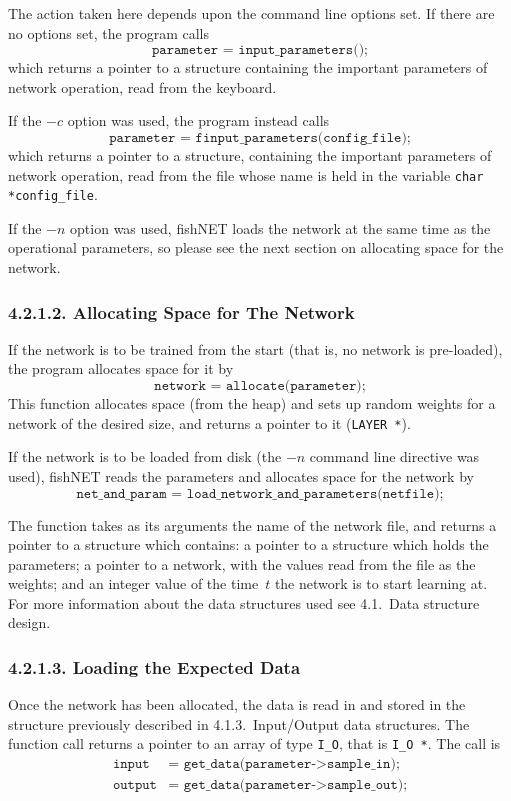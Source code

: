 \documentclass[12pt]{report}
\begin{document}
The action taken here depends upon the command line options set.
If there are no options set, the program calls
$$
	\texttt{parameter = input\_parameters();}
$$
which returns a pointer to a structure containing the important
parameters of network operation, read from the keyboard.

If the $-c$ option was used, the program instead calls
$$
	\texttt{parameter = finput\_parameters(config\_file);}
$$
which returns a pointer to a structure, containing the important
parameters of network operation, read from the file whose name is
held in the variable \texttt{char *config\_file}.

If the $-n$ option was used, fishNET loads the network at the same
time as the operational parameters, so please see the next section
on allocating space for the network.

\subsubsection{4.2.1.2. Allocating Space for The Network}

If the network is to be trained from the start (that is, no network
is pre-loaded), the program allocates space for it by
$$
	\texttt{network = allocate(parameter);}
$$
This function allocates space (from the heap) and sets up random
weights for a network of the desired size, and returns a pointer to
it (\texttt{LAYER *}).

If the network is to be loaded from disk (the $-n$ command line
directive was used), fishNET reads the parameters and allocates
space for the network by
$$
	\texttt{net\_and\_param = load\_network\_and\_parameters(netfile);}
$$

The function takes as its arguments the name of the network file,
and returns a pointer to a structure which contains: a pointer to a
structure which holds the parameters; a pointer to a network, with
the values read from the file as the weights; and an integer value
of the time~$t$ the network is to start learning at.
For more information about the data structures used see 4.1.~Data 
structure design.

\subsubsection{4.2.1.3. Loading the Expected Data}

Once the network has been allocated, the data is read in and stored
in the structure previously described in 4.1.3.~Input/Output data
structures.
The function call returns a pointer to an array of type \texttt{I\_O},
that is \texttt{I\_O *}.
The call is
$$
\begin{aligned}\texttt{input} &\texttt{= get\_data(parameter->sample\_in);}\\
	\texttt{output} &\texttt{= get\_data(parameter->sample\_out);}\\
\end{aligned}$$
\end{document}

